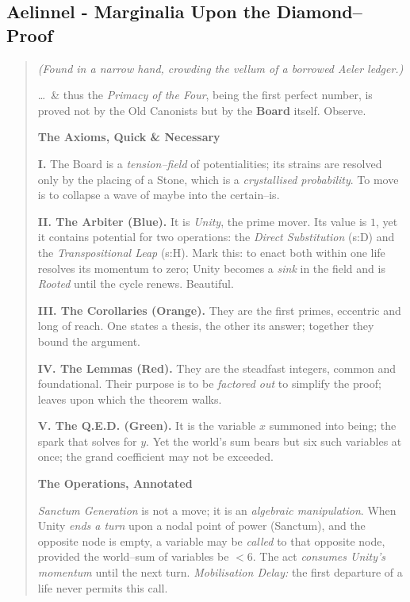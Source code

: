 \documentclass[11pt]{article}
\begin{document}
\subsection{Aelinnel -  Marginalia Upon the Diamond–Proof}
\begin{quote}\small\itshape
\textit{(Found in a narrow hand, crowding the vellum of a borrowed Aeler ledger.)}

\medskip
\ldots\ \& thus the \emph{Primacy of the Four}, being the first perfect number, is proved not by the Old Canonists but by the \textbf{Board} itself. Observe.

\medskip
\textbf{The Axioms, Quick \& Necessary}

\textbf{I.} The Board is a \emph{tension–field} of potentialities; its strains are resolved only by the placing of a Stone, which is a \emph{crystallised probability}. To move is to collapse a wave of maybe into the certain–is.

\textbf{II. The Arbiter (Blue).} It is \emph{Unity}, the prime mover. Its value is $1$, yet it contains potential for two operations: the \emph{Direct Substitution} (s:D) and the \emph{Transpositional Leap} (s:H). Mark this: to enact both within one life resolves its momentum to zero; Unity becomes a \emph{sink} in the field and is \emph{Rooted} until the cycle renews. Beautiful.

\textbf{III. The Corollaries (Orange).} They are the first primes, eccentric and long of reach. One states a thesis, the other its answer; together they bound the argument.

\textbf{IV. The Lemmas (Red).} They are the steadfast integers, common and foundational. Their purpose is to be \emph{factored out} to simplify the proof; leaves upon which the theorem walks.

\textbf{V. The Q.E.D. (Green).} It is the variable $x$ summoned into being; the spark that solves for $y$. Yet the world’s sum bears but six such variables at once; the grand coefficient may not be exceeded.

\medskip
\textbf{The Operations, Annotated}

\emph{Sanctum Generation} is not a move; it is an \emph{algebraic manipulation}. When Unity \emph{ends a turn} upon a nodal point of power (Sanctum), and the opposite node is empty, a variable may be \emph{called} to that opposite node, provided the world–sum of variables be $<6$. The act \emph{consumes Unity’s momentum} until the next turn. \emph{Mobilisation Delay:} the first departure of a life never permits this call.


\end{quote}
\end{document}
